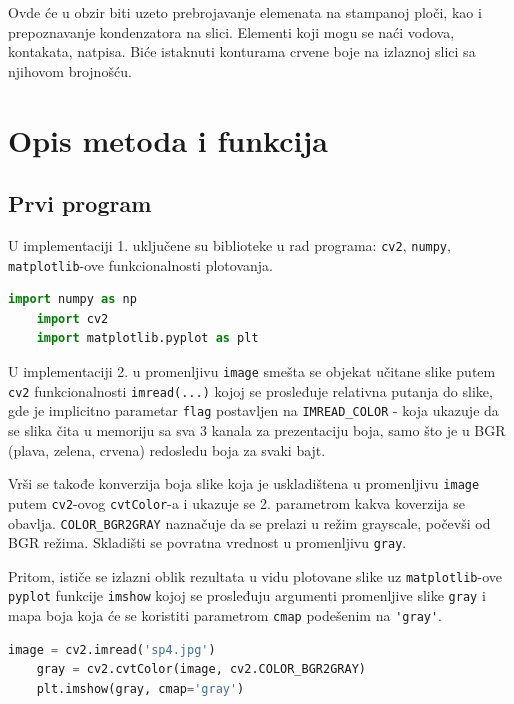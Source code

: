 \documentclass[fontsize=12bp, paper=a4]{scrarticle}
\begin{document}
Ovde će u obzir biti uzeto prebrojavanje elemenata na stampanoj ploči, kao i prepoznavanje kondenzatora na slici. Elementi koji mogu se naći vodova, kontakata, natpisa. Biće istaknuti konturama crvene boje na izlaznoj slici sa njihovom brojnošću.
\section{Opis metoda i funkcija}

\subsection*{Prvi program}
U implementaciji 1.\cite{g4g} uključene su biblioteke u rad programa: \verb|cv2|, \verb|numpy|, \verb|matplotlib|-ove funkcionalnosti plotovanja.
\begin{lstlisting}[language=Python, caption=Uključivanje biblioteka]
    import numpy as np
    import cv2
    import matplotlib.pyplot as plt 
\end{lstlisting}
    
U implementaciji 2. u promenljivu \verb|image| smešta se objekat učitane slike putem \verb|cv2| funkcionalnosti \verb|imread(...)| kojoj se prosleđuje relativna putanja do slike, gde je implicitno parametar \verb|flag| postavljen na \verb|IMREAD_COLOR| - koja ukazuje da se slika čita u memoriju sa sva 3 kanala za prezentaciju boja, samo što je u BGR (plava, zelena, crvena) redosledu boja za svaki bajt. 

Vrši se takođe konverzija boja slike koja je uskladištena u promenljivu \verb|image| putem \verb|cv2|-ovog \verb|cvtColor|-a i ukazuje se 2. parametrom kakva koverzija se obavlja. \verb|COLOR_BGR2GRAY| naznačuje da se prelazi u režim grayscale, počevši od BGR režima. Skladišti se povratna vrednost u promenljivu \verb|gray|.

Pritom, ističe se izlazni oblik rezultata u vidu plotovane slike uz \verb|matplotlib|-ove \verb|pyplot| funkcije \verb|imshow| kojoj se prosleđuju argumenti promenljive slike \verb|gray| i  mapa boja koja će se koristiti parametrom \verb|cmap| podešenim na \verb|'gray'|.
    
\begin{lstlisting}[language=Python, caption={Učitavanje slike, konvertovanje u sivu sliku, plotiranje}  ]
    image = cv2.imread('sp4.jpg') 
    gray = cv2.cvtColor(image, cv2.COLOR_BGR2GRAY) 
    plt.imshow(gray, cmap='gray') 
\end{lstlisting}
\end{document}
